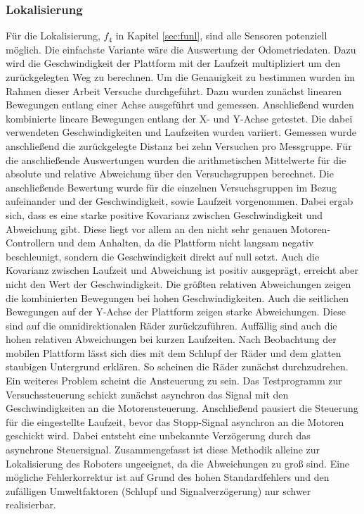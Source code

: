 \subsubsection{Lokalisierung}
Für die Lokalisierung, $f_4$ in Kapitel \ref{sec:funl}, sind alle Sensoren potenziell möglich. Die einfachste Variante wäre die Auswertung der Odometriedaten. Dazu wird die Geschwindigkeit der Plattform mit der Laufzeit multipliziert um den zurückgelegten Weg zu berechnen. Um die Genauigkeit zu bestimmen wurden im Rahmen dieser Arbeit Versuche durchgeführt. Dazu wurden zunächst linearen Bewegungen entlang einer Achse ausgeführt und gemessen. Anschließend wurden kombinierte lineare Bewegungen entlang der X- und Y-Achse getestet. Die dabei verwendeten Geschwindigkeiten und Laufzeiten wurden variiert. Gemessen wurde anschließend die zurückgelegte Distanz bei zehn Versuchen pro Messgruppe. Für die anschließende Auswertungen wurden die arithmetischen Mittelwerte für die absolute und relative Abweichung über den Versuchsgruppen berechnet. Die anschließende Bewertung wurde für die einzelnen Versuchsgruppen im Bezug aufeinander und der Geschwindigkeit, sowie Laufzeit vorgenommen. Dabei ergab sich, dass es eine starke positive Kovarianz zwischen Geschwindigkeit und Abweichung gibt. Diese liegt vor allem an den nicht sehr genauen Motoren-Controllern und dem Anhalten, da die Plattform nicht langsam negativ beschleunigt, sondern die Geschwindigkeit direkt auf null setzt. Auch die Kovarianz zwischen Laufzeit und Abweichung ist positiv ausgeprägt, erreicht aber nicht den Wert der Geschwindigkeit. Die größten relativen Abweichungen zeigen die kombinierten Bewegungen bei hohen Geschwindigkeiten. Auch die seitlichen Bewegungen auf der Y-Achse der Plattform zeigen starke Abweichungen. Diese sind auf die omnidirektionalen Räder zurückzuführen. Auffällig sind auch die hohen relativen Abweichungen bei kurzen Laufzeiten. Nach Beobachtung der mobilen Plattform lässt sich dies mit dem Schlupf der Räder und dem glatten staubigen Untergrund erklären. So scheinen die Räder zunächst durchzudrehen. Ein weiteres Problem scheint die Ansteuerung zu sein. Das Testprogramm zur Versuchssteuerung schickt zunächst asynchron das Signal mit den Geschwindigkeiten an die Motorensteuerung. Anschließend pausiert die Steuerung für die eingestellte Laufzeit, bevor das Stopp-Signal asynchron an die Motoren geschickt wird. Dabei entsteht eine unbekannte Verzögerung durch das asynchrone Steuersignal. Zusammengefasst ist diese Methodik alleine zur Lokalisierung des Roboters ungeeignet, da die Abweichungen zu groß sind. Eine mögliche Fehlerkorrektur ist auf Grund des hohen Standardfehlers und den zufälligen Umweltfaktoren (Schlupf und Signalverzögerung) nur schwer realisierbar.


